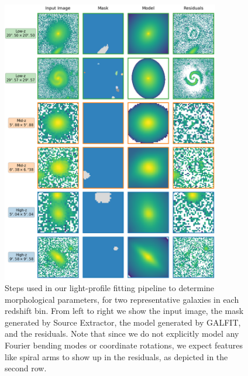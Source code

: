 \documentclass[linenumbers,twocolumn,twocolappendix]{aastex631}
\begin{document}
\begin{CJK*}{UTF8}{gbsn}
\begin{figure}[htb]
    \centering
    \includegraphics[width = 0.85\textwidth]{galfit_example_fits.png}
    \caption{
     Steps used in our light-profile fitting pipeline to determine morphological parameters, for two representative galaxies in each redshift bin. From left to right we show the input image, the  mask generated by Source Extractor, the model generated by GALFIT, and the residuals. Note that since we do not explicitly model any Fourier bending modes or coordinate rotations, we expect features like spiral arms to show up in the residuals, as depicted in the second row.
    }
    \label{fig:galfit_example_fits}
\end{figure}


\end{CJK*}
\end{document}
